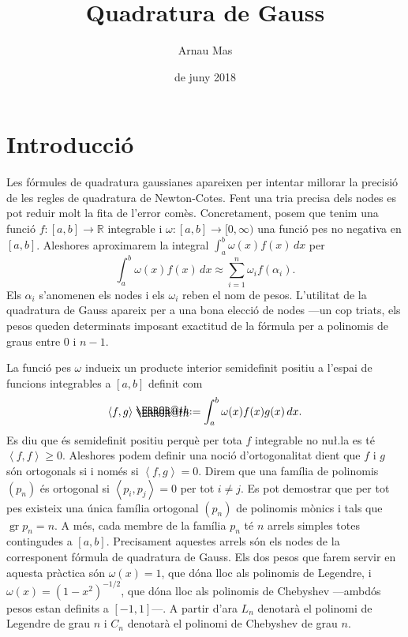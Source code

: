\documentclass[12pt]{article}
\title{\sffamily {\bfseries Pràctica 4:} Quadratura de Gauss}
\author{\sffamily Arnau Mas}
\date{\sffamily 6 de juny 2018}
\makeatletter
\numberwithin{table}{section}
\numberwithin{figure}{section}
\numberwithin{equation}{section}
\newcommand{\R}{\mathbb{R}}
\DeclareMathOperator{\gr}{gr}
\newcommand{\inn}[2]{\left\langle #1 , #2 \right\rangle}
\newcommand*{\defeq}{\mathrel{\rlap{%
    \raisebox{0.3ex}{$\m@th\cdot$}}%
  \raisebox{-0.3ex}{$\m@th\cdot$}}%
=}
\makeatother
\begin{document}
\maketitle

\section{Introducció}
Les fórmules de quadratura gaussianes apareixen per intentar millorar la precisió de les regles de quadratura de Newton-Cotes. Fent una tria precisa dels nodes es pot reduir molt la fita de l'error comès. Concretament, posem que tenim una funció \( f \colon [a,b] \longrightarrow \R \) integrable i \( \omega \colon [a,b] \longrightarrow [0, \infty) \) una funció pes no negativa en \( [a,b] \). Aleshores aproximarem la integral \( \int_a^b \omega(x)f(x) \, dx \) per
\begin{equation*}
 	\int_a^b \omega(x)f(x) \, dx \approx \sum_{i = 1}^n \omega_i f(\alpha_i). 
\end{equation*}
Els \( \alpha_i \) s'anomenen els nodes i els \( \omega_i \) reben el nom de pesos. L'utilitat de la quadratura de Gauss apareix per a una bona elecció de nodes ---un cop triats, els pesos queden determinats imposant exactitud de la fórmula per a polinomis de graus entre 0 i \( n-1 \).  

La funció pes \( \omega \) indueix un producte interior semidefinit positiu a l'espai de funcions integrables a \( [a,b] \) definit com
\begin{equation*}
	\inn{f}{g} \defeq \int_a^b \omega(x) f(x) g(x) \, dx.
\end{equation*}
Es diu que és semidefinit positiu perquè per tota \( f \) integrable no nu\l.la es té \( \inn{f}{f} \geq 0 \). Aleshores podem definir una noció d'ortogonalitat dient que \( f \) i \( g \) són ortogonals si i només si \( \inn{f}{g} = 0 \). Direm que una família de polinomis \( (p_n) \) és ortogonal si \( \inn{p_i}{p_j} = 0 \) per tot \( i \neq j \). Es pot demostrar que per tot pes existeix una única família ortogonal \( (p_n) \) de polinomis mònics i tals que \( \gr p_n = n \). A més, cada membre de la família \( p_n \) té \( n \) arrels simples totes contingudes a \( [a,b] \). Precisament aquestes arrels són els nodes de la corresponent fórmula de quadratura de Gauss. Els dos pesos que farem servir en aquesta pràctica són \( \omega(x) = 1 \), que dóna lloc als polinomis de Legendre, i \( \omega(x) = (1 - x^2)^{-1/2} \), que dóna lloc als polinomis de Chebyshev ---ambdós pesos estan definits a \( [-1,1] \)---. A partir d'ara \( L_n \) denotarà el polinomi de Legendre de grau \( n \) i \( C_n \) denotarà el polinomi de Chebyshev de grau \( n \). 
\end{document}
